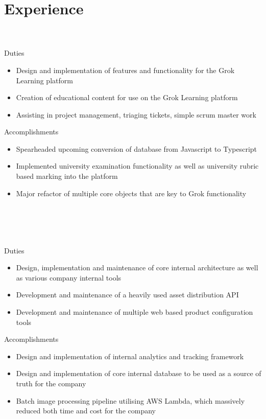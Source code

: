 \documentclass{resume}
\begin{document}
\section{{\faBriefcase} Experience}
 \\
 \\
Duties \\
\begin{itemize}
  \item Design and implementation of features and functionality for the Grok Learning platform
  \item Creation of educational content for use on the Grok Learning platform
  \item Assisting in project management, triaging tickets, simple scrum master work
\end{itemize}
Accomplishments \\
\begin{itemize}
  \item Spearheaded upcoming conversion of database from Javascript to Typescript
  \item Implemented university examination functionality as well as university rubric based marking into the platform
  \item Major refactor of multiple core objects that are key to Grok functionality
\end{itemize}

\bigskip
{} \\
 \\
 \\
 \\
Duties \\
\begin{itemize}
  \item Design, implementation and maintenance of core internal architecture as well as various company internal tools
  \item Development and maintenance of a heavily used asset distribution API
  \item Development and maintenance of multiple web based product configuration tools
\end{itemize}
Accomplishments \\
\begin{itemize}
  \item Design and implementation of internal analytics and tracking framework
  \item Design and implementation of core internal database to be used as a source of truth for the company
  \item Batch image processing pipeline utilising AWS Lambda, which massively reduced both time and cost for the company
\end{itemize}
\end{document}
